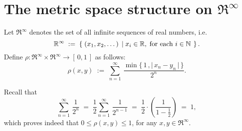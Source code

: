 

\section{The metric space structure on $\Re^{\infty}$}
\setcounter{theorem}{0}
\setcounter{equation}{0}

\renewcommand{\theenumi}{\roman{enumi}}
\renewcommand{\labelenumi}{\textnormal{(\theenumi)}$\;\;$}

\begin{definition}
\label{RInfinityMetricSpace}
\mbox{}\vskip 0.1cm
\noindent
Let $\Re^{\infty}$ denotes the set of all infinite sequences of real numbers, i.e.
\begin{equation*}
\mathbb{R}^{\infty}
\; := \;
\left\{\;
(x_{1},x_{2},\ldots\,)
\;\left\vert\;
x_{i} \in \mathbb{R},\;\textnormal{for each $i \in \mathbb{N}$}
\right.
\;\right\}.
\end{equation*}
Define $\rho : \Re^{\infty} \times \Re^{\infty} \longrightarrow [\,0,1\,]$ as follows:
\begin{equation*}
\rho(x,y)
\; := \;
\sum_{n=1}^{\infty}\,\dfrac{\min\{\,1\,,\vert\,x_{n}-y_{n}\,\vert\,\}}{2^{n}}.
\end{equation*}
\end{definition}

\begin{remark}
Recall that
\begin{equation*}
\sum_{n=1}^{\infty}\,\dfrac{1}{2^{n}}
\;=\; \dfrac{1}{2} \sum_{n=1}^{\infty}\,\dfrac{1}{2^{n-1}}
\;=\; \dfrac{1}{2}\cdot\left(\dfrac{1}{1 - \frac{1}{2}}\right)
\;=\; 1,
\end{equation*}
which proves indeed that $0 \leq \rho(x,y) \leq 1$, for any $x, y \in \Re^{\infty}$.
\end{remark}

